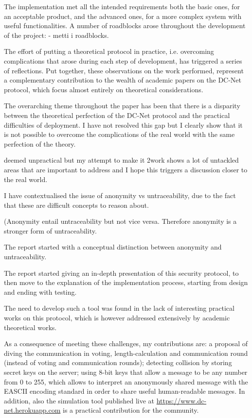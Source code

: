 The implementation met all the intended requirements both the basic ones, for an acceptable product, and the advanced ones, for a more complex system with useful functionalities. A number of roadblocks arose throughout the development of the project: - metti i roadblocks. 

 The effort of putting a theoretical protocol in practice, i.e. overcoming complications that arose during each step of development, has triggered a series of reflections. Put together, these observations on the work performed, represent a complementary contribution to the wealth of academic papers on the DC-Net protocol, which focus almost entirely on theoretical considerations.

The overarching theme throughout the paper has been that there is a disparity between the theoretical perfection of the DC-Net protocol and the practical difficulties of deployment. 
 I have not resolved this gap but I clearly show that it is not possible to overcome the complications of the real world with the same perfection of the theory. 
 
 deemed unpractical but my attempt to make it 2work shows a lot of untackled areas that are important to address and I hope this triggers a discussion closer to the real world. 
 
 
 I have contextualised the issue of anonymity vs untraceability, due to the fact that these are difficult concepts to reason about. 
 
 (Anonymity entail untraceability but not vice versa. Therefore anonymity is a stronger form of untraceability.
 
 
 The report started with a conceptual distinction between anonymity and untraceability.
 
 
 




The report started giving an in-depth presentation of this security protocol, to then move to the explanation of the implementation process, starting from design and ending with testing. 

The need to develop such a tool was found in the lack of interesting practical works on this protocol, which is however addressed extensively by academic theoretical works. 


As a consequence of meeting these challenges, my contributions are: a proposal of diving the communication in voting, length-calculation and communication round (instead of voting and communication rounds); detecting collision by storing secret keys on the server; using 8-bit keys that allow a message to be any number from 0 to 255, which allows to interpret an anonymously shared message with the EASCII encoding standard in order to share useful human-readable messages. In addition, also the simulation tool published live at \url{https://www.dc-net.herokuapp.com} is a practical contribution for the community. 

